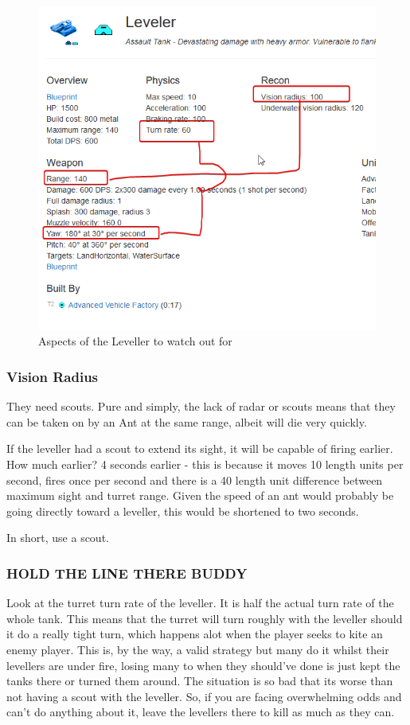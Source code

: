 \documentclass[]{article}
\begin{document}
\begin{figure}
	\centering
	\includegraphics[width=\linewidth]{zp9bTfg}
	\caption{Aspects of the Leveller to watch out for}
	\label{fig:zp9btfg}
\end{figure}
\subsubsection{Vision Radius}

They need scouts.  Pure and simply, the lack of radar or scouts means that they can be taken on by an Ant at the same range, albeit will die very quickly.  

If the leveller had a scout to extend its sight, it will be capable of firing earlier.  How much earlier?  4 seconds earlier - this is because it moves 10 length units per second, fires once per second and there is a 40 length unit difference between maximum sight and turret range.  Given the speed of an ant would probably be going directly toward a leveller, this would be shortened to two seconds.  

In short, use a scout.  

\subsubsection{HOLD THE LINE THERE BUDDY}
Look at the turret turn rate of the leveller.  It is half the actual turn rate of the whole tank.  This means that the turret will turn roughly with the leveller should it do a really tight turn, which happens alot when the player seeks to kite an enemy player.  This is, by the way, a valid strategy but many do it whilst their levellers are under fire, losing many to when they should've done is just kept the tanks there or turned them around.  The situation is so bad that its worse than not having a scout with the leveller.  So, if you are facing overwhelming odds and can't do anything about it, leave the levellers there to kill as much as they can. 
\end{document}
